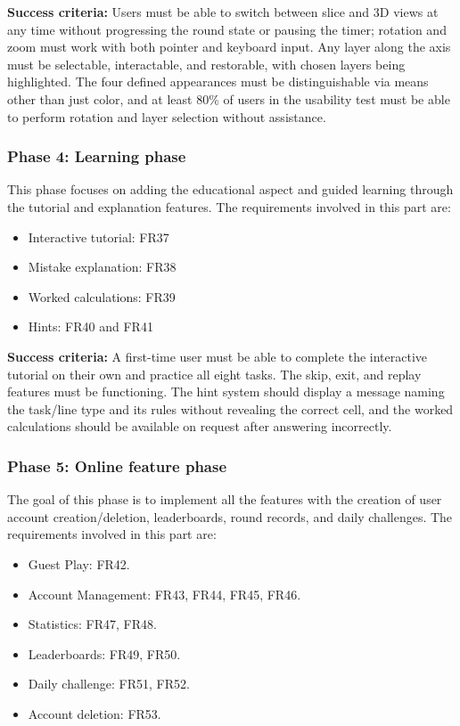 \documentclass[12pt]{article}
\begin{document}
\textbf{Success criteria:} Users must be able to switch between slice and 3D views at any time without progressing the round state or pausing the timer; rotation and zoom must work with
both pointer and keyboard input. Any layer along the axis must be selectable, interactable, and restorable, with chosen layers being highlighted.
The four defined appearances must be distinguishable via means other than just color, and at least 80\% of users in the usability test must be able to perform rotation and layer selection without assistance.

\subsubsection{Phase 4: Learning phase}

This phase focuses on adding the educational aspect and guided learning through the tutorial and explanation features.
The requirements involved in this part are: 
\begin{itemize}
\item Interactive tutorial: FR37
\item Mistake explanation: FR38
\item Worked calculations: FR39
\item Hints: FR40 and FR41
\end{itemize}

\textbf{Success criteria:} A first-time user must be able to complete the interactive tutorial on their own and practice all eight tasks. The skip, exit, and replay features must be functioning.
The hint system should display a message naming the task/line type and its rules without revealing the correct cell, and the worked calculations should be available on request after answering incorrectly.

\subsubsection{Phase 5: Online feature phase}

The goal of this phase is to implement all the features with the creation of user account creation/deletion, leaderboards, round records, and daily challenges.
The requirements involved in this part are: 
\begin{itemize}
\item Guest Play: FR42.
\item Account Management: FR43, FR44, FR45, FR46.
\item Statistics: FR47, FR48.
\item Leaderboards: FR49, FR50.
\item Daily challenge: FR51, FR52.
\item Account deletion: FR53.
\end{itemize}
\end{document}
